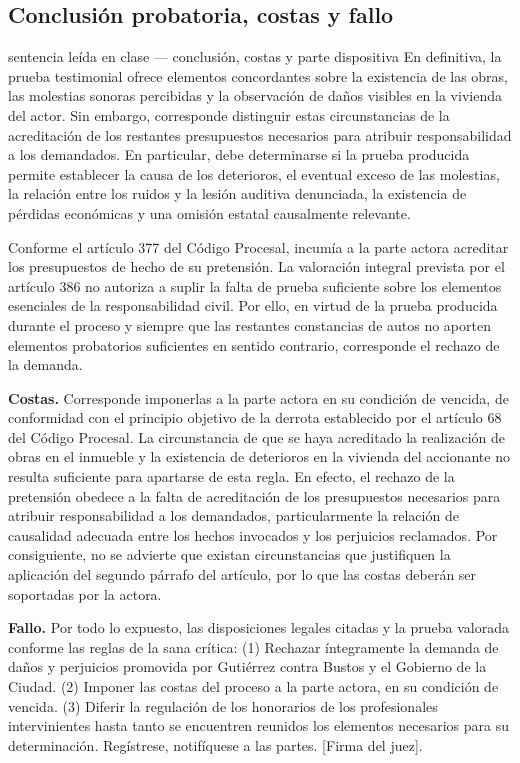 \documentclass[12pt,oneside]{book}
\begin{document}
\subsection{Conclusi\'on probatoria, costas y fallo}

\begin{example}{sentencia le\'ida en clase --- conclusi\'on, costas y parte dispositiva}
En definitiva, la prueba testimonial ofrece elementos concordantes sobre la existencia de las obras, las molestias sonoras percibidas y la observaci\'on de da\~nos visibles en la vivienda del actor. Sin embargo, corresponde distinguir estas circunstancias de la acreditaci\'on de los restantes presupuestos necesarios para atribuir responsabilidad a los demandados. En particular, debe determinarse si la prueba producida permite establecer la causa de los deterioros, el eventual exceso de las molestias, la relaci\'on entre los ruidos y la lesi\'on auditiva denunciada, la existencia de p\'erdidas econ\'omicas y una omisi\'on estatal causalmente relevante.

Conforme el art\'iculo 377 del C\'odigo Procesal, incum\'ia a la parte actora acreditar los presupuestos de hecho de su pretensi\'on. La valoraci\'on integral prevista por el art\'iculo 386 no autoriza a suplir la falta de prueba suficiente sobre los elementos esenciales de la responsabilidad civil. Por ello, en virtud de la prueba producida durante el proceso y siempre que las restantes constancias de autos no aporten elementos probatorios suficientes en sentido contrario, corresponde el rechazo de la demanda.

\textbf{Costas.} Corresponde imponerlas a la parte actora en su condici\'on de vencida, de conformidad con el principio objetivo de la derrota establecido por el art\'iculo 68 del C\'odigo Procesal. La circunstancia de que se haya acreditado la realizaci\'on de obras en el inmueble y la existencia de deterioros en la vivienda del accionante no resulta suficiente para apartarse de esta regla. En efecto, el rechazo de la pretensi\'on obedece a la falta de acreditaci\'on de los presupuestos necesarios para atribuir responsabilidad a los demandados, particularmente la relaci\'on de causalidad adecuada entre los hechos invocados y los perjuicios reclamados. Por consiguiente, no se advierte que existan circunstancias que justifiquen la aplicaci\'on del segundo p\'arrafo del art\'iculo, por lo que las costas deber\'an ser soportadas por la actora.

\textbf{Fallo.} Por todo lo expuesto, las disposiciones legales citadas y la prueba valorada conforme las reglas de la sana cr\'itica: (1) Rechazar \'integramente la demanda de da\~nos y perjuicios promovida por Guti\'errez contra Bustos y el Gobierno de la Ciudad. (2) Imponer las costas del proceso a la parte actora, en su condici\'on de vencida. (3) Diferir la regulaci\'on de los honorarios de los profesionales intervinientes hasta tanto se encuentren reunidos los elementos necesarios para su determinaci\'on. Reg\'istrese, notif\'iquese a las partes. [Firma del juez].
\end{example}
\end{document}
